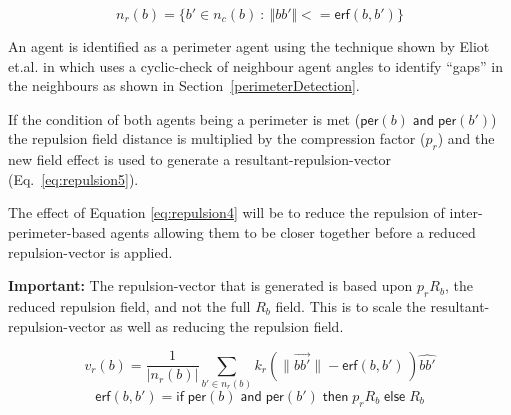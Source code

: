 \documentclass[12pt,a4paper]{IEEEtran}
\newcommand{\important}[1]{\begin{importantBox} \textbf{Important:} #1 \end{importantBox}}
\newcommand{\magn}[1]{\Vert{#1}\Vert}
\begin{document}
\begin{equation}\label{eq:repulsion3}
n_r(b) = \{b' \in n_c(b)~:~\magn{bb'} <= \mathsf{erf}(b,b')\}
\end{equation}

An agent is identified as a perimeter agent using the technique shown by Eliot et.al. in \cite{eliot2019void} which uses a cyclic-check of neighbour agent angles to identify ``gaps'' in the neighbours as shown in Section~\ref{perimeterDetection}.

If the condition of both agents being a perimeter is met ($\mathsf{per}(b) \; \mathsf{and} \; \mathsf{per}(b')$) the repulsion field distance is multiplied by the compression factor ($p_r$) and the new field effect is used to generate a resultant-repulsion-vector (Eq.~\ref{eq:repulsion5}). 

The effect of Equation \ref{eq:repulsion4} will be to reduce the repulsion of inter-perimeter-based agents allowing them to be closer together before a reduced repulsion-vector is applied. 

\important{The repulsion-vector that is generated is based upon $p_rR_b$, the reduced repulsion field, and not the full $R_b$ field. This is to scale the resultant-repulsion-vector as well as reducing the repulsion field.}
\small
\begin{equation}\label{eq:repulsion4}
v_r(b) = \frac{1}{\lvert n_r(b)\rvert}\sum_{b' \in n_r(b)} k_r\left(\lVert\vec{b b'}\rVert - \mathsf{erf}(b,b') \, \right)\widehat{bb'}
\end{equation}
\normalsize
\small
\begin{equation}\label{eq:repulsion5}
\mathsf{erf}(b, b') = \mathsf{if} \;
\mathsf{per}(b) \; \mathsf{and} \; \mathsf{per}(b') \; \mathsf{then} \;
p_rR_b \; \mathsf{else} \; R_b
\end{equation}
\normalsize
\end{document}

